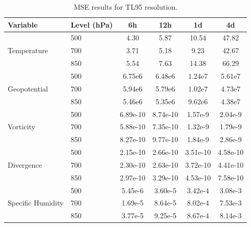 \begin{table}[ht]
\centering
\small
\label{tab:MSE_95}
\begin{tabular}{llcccc}
\hline
\textbf{Variable} & \textbf{Level (hPa)} & \textbf{6h} & \textbf{12h} & \textbf{1d} & \textbf{4d} \\
\hline\hline

\multirow{3}{*}{Temperature}
    & 500 & 4.30 & 5.87 & 10.54 & 47.82 \\
    & 700 & 3.71 & 5.18 & 9.23 & 42.67 \\
    & 850 & 5.54 & 7.63 & 14.38 & 66.29 \\ 
\hline

\multirow{3}{*}{Geopotential}
    & 500 & 6.75e6 & 6.48e6 & 1.24e7 & 5.61e7 \\
    & 700 & 5.94e6 & 5.79e6 & 1.02e7 & 4.73e7 \\
    & 850 & 5.46e6 & 5.35e6 & 9.62e6 & 4.38e7 \\ 
\hline

\multirow{3}{*}{Vorticity}
    & 500 & 6.89e-10 & 8.74e-10 & 1.57e-9 & 2.04e-9 \\
    & 700 & 5.88e-10 & 7.35e-10 & 1.32e-9 & 1.79e-9 \\
    & 850 & 8.27e-10 & 9.77e-10 & 1.84e-9 & 2.86e-9 \\ 
\hline

\multirow{3}{*}{Divergence}
    & 500 & 2.15e-10 & 2.66e-10 & 3.51e-10 & 4.58e-10 \\
    & 700 & 2.30e-10 & 2.63e-10 & 3.72e-10 & 4.41e-10 \\
    & 850 & 2.97e-10 & 3.29e-10 & 4.53e-10 & 7.58e-10 \\ 
\hline

\multirow{3}{*}{Specific Humidity}
    & 500 & 5.45e-6 & 3.60e-5 & 3.42e-4 & 3.08e-3 \\
    & 700 & 1.69e-5 & 8.64e-5 & 8.02e-4 & 7.53e-3 \\
    & 850 & 3.77e-5 & 9.25e-5 & 8.67e-4 & 8.14e-3 \\ 
\hline

\end{tabular}
\caption{MSE results for TL95 resolution.}
\end{table}


